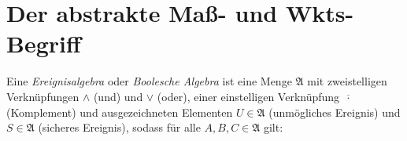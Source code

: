 \documentclass{cheat-sheet}
\newcommand{\Alg}{\mathfrak{A}} %
\begin{document}



\section{Der abstrakte Maß- und Wkts-Begriff}


\iffalse
\begin{defn}
  Ein \emph{zufälliger Versuch} ist ein Experiment,
  \begin{itemize}
    \item welches unter einem festen Bedingungskomplex beliebig oft wiederholbar ist und
    \item dessen Ausgänge wohldefiniert und bei jeder Wiederholung ungewiss sind.
  \end{itemize}
\end{defn}

\begin{defn}
  Ein zufälliges Ereignis ist ein Ergebnis eines zufälligen Experiments.
\end{defn}
\fi


\begin{defn}
  Eine \emph{Ereignisalgebra} oder \emph{Boolesche Algebra} ist eine Menge $\Alg$ mit zweistelligen Verknüpfungen $\wedge$ (\glqq und\grqq) und $\vee$ (\glqq oder\grqq), einer einstelligen Verknüpfung $\overline{\,\cdot\,}$ (Komplement) und ausgezeichneten Elementen $U \in \Alg$ (unmögliches Ereignis) und $S \in \Alg$ (sicheres Ereignis), sodass für alle $A, B, C \in \Alg$ gilt:

  {\scriptsize
  \begin{itemize}%
  \end{itemize}}
\end{defn}
\end{document}
